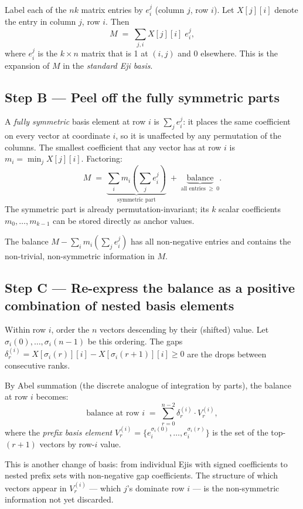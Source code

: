 \documentclass[11pt,a4paper]{article}
\newcommand{\eji}[2]{e^{#1}_{#2}}       %
\begin{document}
Label each of the $nk$ matrix entries by $\eji{j}{i}$ (column $j$, row $i$).
Let $X[j][i]$ denote the entry in column $j$, row $i$.  Then
\[
  M \;=\; \sum_{j,i} X[j][i]\;\eji{j}{i},
\]
where $\eji{j}{i}$ is the $k\times n$ matrix that is 1 at $(i,j)$ and 0
elsewhere.  This is the expansion of $M$ in the \emph{standard Eji basis}.

\subsection*{Step B — Peel off the fully symmetric parts}

A \emph{fully symmetric} basis element at row $i$ is $\sum_j \eji{j}{i}$: it
places the same coefficient on every vector at coordinate $i$, so it is
unaffected by any permutation of the columns.  The smallest coefficient that
any vector has at row $i$ is $m_i = \min_j X[j][i]$.  Factoring:
\[
  M \;=\; \underbrace{\sum_i m_i \!\left(\sum_j \eji{j}{i}\right)}_{\text{symmetric part}}
    \;+\; \underbrace{\text{balance}}_{\text{all entries} \;\ge\; 0}.
\]
The symmetric part is already permutation-invariant; its $k$ scalar
coefficients $m_0,\ldots,m_{k-1}$ can be stored directly as anchor values.

The balance $M - \sum_i m_i (\sum_j \eji{j}{i})$ has all non-negative
entries and contains the non-trivial, non-symmetric information in $M$.

\subsection*{Step C — Re-express the balance as a positive combination of
             nested basis elements}

Within row $i$, order the $n$ vectors descending by their (shifted) value.
Let $\sigma_i(0),\ldots,\sigma_i(n-1)$ be this ordering.  The gaps
$\delta^{(i)}_r = X[\sigma_i(r)][i] - X[\sigma_i(r+1)][i] \ge 0$ are the
drops between consecutive ranks.

By Abel summation (the discrete analogue of integration by parts), the balance
at row $i$ becomes:
\[
  \text{balance at row }i
    \;=\; \sum_{r=0}^{n-2} \delta^{(i)}_r \cdot V^{(i)}_r,
\]
where the \emph{prefix basis element} $V^{(i)}_r =
\bigl\{\eji{\sigma_i(0)}{i},\ldots, \eji{\sigma_i(r)}{i}\bigr\}$
is the set of the top-$(r{+}1)$ vectors by row-$i$ value.

This is another change of basis: from individual Ejis with signed coefficients
to nested prefix sets with non-negative gap coefficients.  The structure of
which vectors appear in $V^{(i)}_r$ — which $j$'s dominate row $i$ — is the
non-symmetric information not yet discarded.
\end{document}
